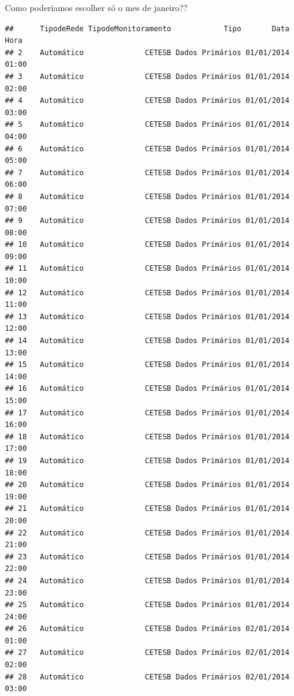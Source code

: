 \documentclass[]{book}
\newenvironment{Shaded}{\begin{snugshade}}{\end{snugshade}}
\newcommand{\StringTok}[1]{\textcolor[rgb]{0.31,0.60,0.02}{#1}}
\newcommand{\CommentTok}[1]{\textcolor[rgb]{0.56,0.35,0.01}{\textit{#1}}}
\newcommand{\OperatorTok}[1]{\textcolor[rgb]{0.81,0.36,0.00}{\textbf{#1}}}
\newcommand{\NormalTok}[1]{#1}
\begin{document}
Como poderiamos escolher só o mes de janeiro??

\begin{Shaded}
\end{Shaded}

\begin{verbatim}
##      TipodeRede TipodeMonitoramento            Tipo       Data  Hora
## 2    Automático              CETESB Dados Primários 01/01/2014 01:00
## 3    Automático              CETESB Dados Primários 01/01/2014 02:00
## 4    Automático              CETESB Dados Primários 01/01/2014 03:00
## 5    Automático              CETESB Dados Primários 01/01/2014 04:00
## 6    Automático              CETESB Dados Primários 01/01/2014 05:00
## 7    Automático              CETESB Dados Primários 01/01/2014 06:00
## 8    Automático              CETESB Dados Primários 01/01/2014 07:00
## 9    Automático              CETESB Dados Primários 01/01/2014 08:00
## 10   Automático              CETESB Dados Primários 01/01/2014 09:00
## 11   Automático              CETESB Dados Primários 01/01/2014 10:00
## 12   Automático              CETESB Dados Primários 01/01/2014 11:00
## 13   Automático              CETESB Dados Primários 01/01/2014 12:00
## 14   Automático              CETESB Dados Primários 01/01/2014 13:00
## 15   Automático              CETESB Dados Primários 01/01/2014 14:00
## 16   Automático              CETESB Dados Primários 01/01/2014 15:00
## 17   Automático              CETESB Dados Primários 01/01/2014 16:00
## 18   Automático              CETESB Dados Primários 01/01/2014 17:00
## 19   Automático              CETESB Dados Primários 01/01/2014 18:00
## 20   Automático              CETESB Dados Primários 01/01/2014 19:00
## 21   Automático              CETESB Dados Primários 01/01/2014 20:00
## 22   Automático              CETESB Dados Primários 01/01/2014 21:00
## 23   Automático              CETESB Dados Primários 01/01/2014 22:00
## 24   Automático              CETESB Dados Primários 01/01/2014 23:00
## 25   Automático              CETESB Dados Primários 01/01/2014 24:00
## 26   Automático              CETESB Dados Primários 02/01/2014 01:00
## 27   Automático              CETESB Dados Primários 02/01/2014 02:00
## 28   Automático              CETESB Dados Primários 02/01/2014 03:00

\end{verbatim}
\end{document}
